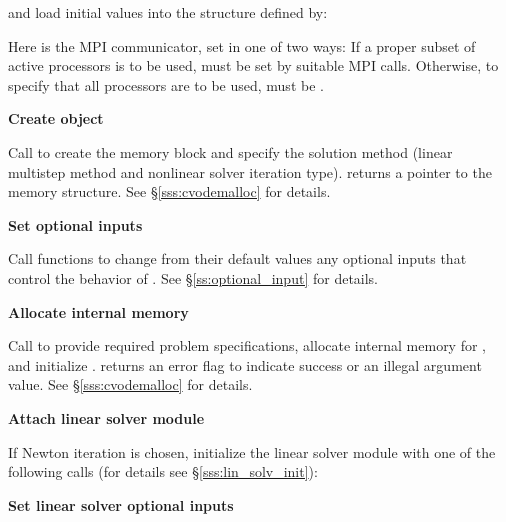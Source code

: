 \begin{Steps}
  and load initial values into the structure defined by:

  {\s} 

  {\p} 

  Here  is the MPI communicator, set in one of two ways: 
  If a proper subset of active processors is to be used,  
  must be set by suitable MPI calls. Otherwise, to specify that all 
  processors are to be used,  must be .
  
\item\label{i:cvode_create} 
  {\bf Create {\cvode} object}

  Call  
  to create the {\cvode} memory block and specify the solution method
  (linear multistep method and nonlinear solver iteration type).
   returns a pointer to the {\cvode} memory structure.
  See \S\ref{sss:cvodemalloc} for details.

\item
  {\bf Set optional inputs}

  Call  functions to change from their default values any
  optional inputs that control the behavior of {\cvode}.
  See \S\ref{ss:optional_input} for details.

\item\label{i:cvode_malloc} 
  {\bf Allocate internal memory}

  Call  
  to provide required problem specifications,
  allocate internal memory for {\cvode}, 
  and initialize {\cvode}.
   returns an error flag to indicate success or an illegal
  argument value.  See \S\ref{sss:cvodemalloc} for details.
  
\item\label{i:lin_solver} 
  {\bf Attach linear solver module}

  If Newton iteration is chosen, initialize the linear solver module
  with one of the following calls (for details see \S\ref{sss:lin_solv_init}):

  {\s} 

  {\s} 


  
\item
  {\bf Set linear solver optional inputs}


\end{Steps}
